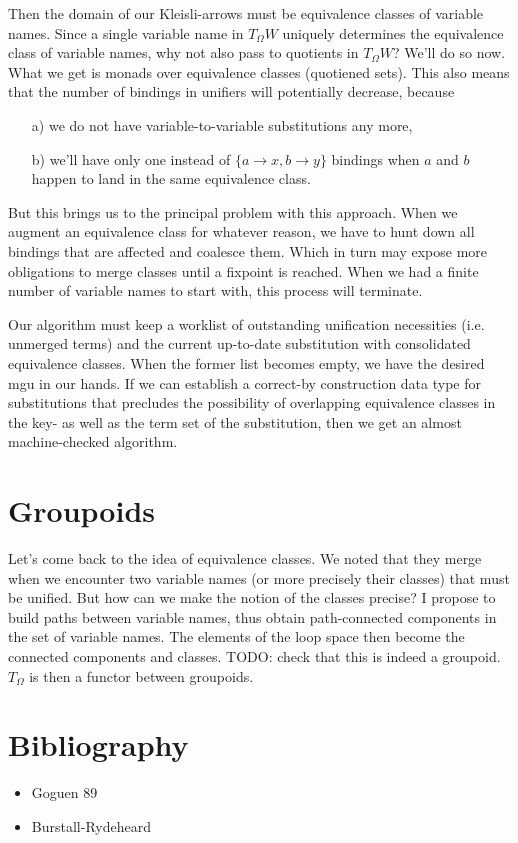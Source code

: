 \documentclass{article}
\begin{document}
Then the domain of our Kleisli-arrows must be equivalence classes of variable names. Since a single variable name in $T_{\Omega}W$ uniquely determines the equivalence class of variable names, why not also pass to quotients in $T_{\Omega}W$?
We'll do so now. What we get is monads over equivalence classes (quotiened sets). This also means that the number of bindings in unifiers will potentially decrease, because
\begin{itemize}
\item[a)] we do not have variable-to-variable substitutions any more,
\item[b)] we'll have only one instead of $\{a \to x, b \to y\}$ bindings when $a$ and $b$ happen to land in the same equivalence class.
\end{itemize}
But this brings us to the principal problem with this approach. When we augment an equivalence class for whatever reason, we have to hunt down all bindings that are affected and coalesce them. Which in turn may expose more obligations to merge classes until a fixpoint is reached. When we had a finite number of variable names to start with, this process will terminate.
\par Our algorithm must keep a worklist of outstanding unification necessities (i.e. unmerged terms) and the current up-to-date substitution with consolidated equivalence classes.
When the former list becomes empty, we have the desired mgu in our hands.
If we can establish a correct-by construction data type for substitutions that precludes the possibility of overlapping equivalence classes in the key- as well as the term set of the substitution, then we get an almost machine-checked algorithm.

\section {Groupoids}
Let's come back to the idea of equivalence classes. We noted that they merge when we encounter two variable names (or more precisely their classes) that must be unified. But how can we make the notion of the classes precise? I propose to build paths between variable names, thus obtain path-connected components in the set of variable names. The elements of the loop space then become the connected components and classes. TODO: check that this is indeed a groupoid. $T_{\Omega}$ is then a functor between groupoids.

\section {Bibliography}
\begin{itemize}
\item Goguen 89
\item Burstall-Rydeheard
\end{itemize}
\end{document}

